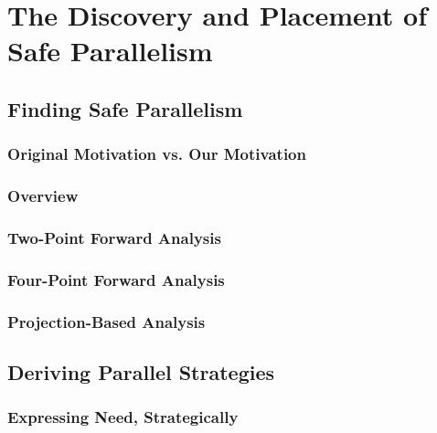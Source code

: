 \documentclass[dottedtoc, headinclude, footinclude=true, a4paper, numbers=noenddot]{scrreprt}
\begin{document}
\part{The Discovery and Placement of Safe Parallelism}
\label{part:static}

    \chapter{Finding Safe Parallelism}
    \label{chap:discovery} 
    

        \section{Original Motivation vs. Our Motivation}
        
    
        \section{Overview}
        \label{sec:strictnessOverview}
        
    
        \section{Two-Point Forward Analysis}
        \label{sec:twoPoint}
        
    
        \section{Four-Point Forward Analysis}
        \label{sec:fourPoint}
        
    
        \section{Projection-Based Analysis}
        \label{sec:projections}
        


    \chapter{Deriving Parallel Strategies}
    \label{chap:derivation}

        \section{Expressing Need, Strategically}
        \label{sec:derivations}
        
    
\end{document}
